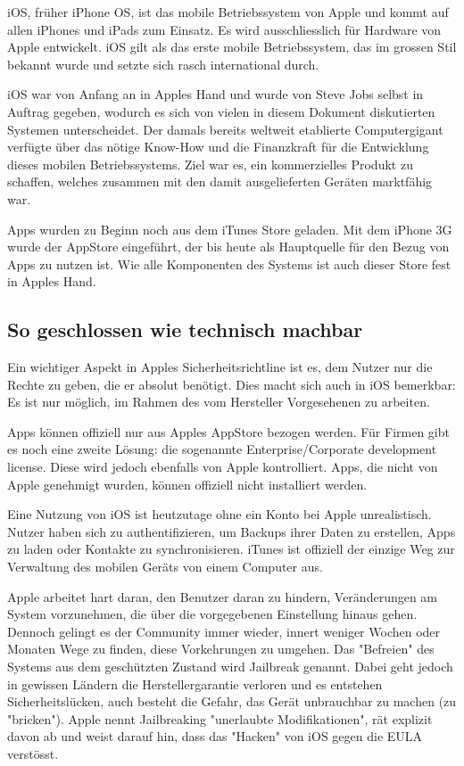 iOS, früher iPhone OS, ist das mobile Betriebssystem von Apple und kommt auf allen iPhones und iPads zum Einsatz. Es wird ausschliesslich für Hardware von Apple entwickelt. iOS gilt als das erste mobile Betriebssystem, das im grossen Stil bekannt wurde und setzte sich rasch international durch.

iOS war von Anfang an in Apples Hand und wurde von Steve Jobs selbst in Auftrag gegeben, wodurch es sich von vielen in diesem Dokument diskutierten Systemen unterscheidet. Der damals bereits weltweit etablierte Computergigant verfügte über das nötige Know-How und die Finanzkraft für die Entwicklung dieses mobilen Betriebssystems. Ziel war es, ein kommerzielles Produkt zu schaffen, welches zusammen mit den damit ausgelieferten Geräten marktfähig war.

Apps wurden zu Beginn noch aus dem iTunes Store geladen. Mit dem iPhone 3G wurde der AppStore eingeführt, der bis heute als Hauptquelle für den Bezug von Apps zu nutzen ist. Wie alle Komponenten des Systems ist auch dieser Store fest in Apples Hand.\\

\subsection{So geschlossen wie technisch machbar}
Ein wichtiger Aspekt in Apples Sicherheitsrichtline ist es, dem Nutzer nur die Rechte zu geben, die er absolut benötigt. Dies macht sich auch in iOS bemerkbar: Es ist nur möglich, im Rahmen des vom Hersteller Vorgesehenen zu arbeiten.

Apps können offiziell nur aus Apples AppStore bezogen werden. Für Firmen gibt es noch eine zweite Lösung: die sogenannte Enterprise/Corporate development license. Diese wird jedoch ebenfalls von Apple kontrolliert. Apps, die nicht von Apple genehmigt wurden, können offiziell nicht installiert werden.

Eine Nutzung von iOS ist heutzutage ohne ein Konto bei Apple unrealistisch. Nutzer haben sich zu authentifizieren, um Backups ihrer Daten zu erstellen, Apps zu laden oder Kontakte zu synchronisieren. iTunes ist offiziell der einzige Weg zur Verwaltung des mobilen Geräts von einem Computer aus.

Apple arbeitet hart daran, den Benutzer daran zu hindern, Veränderungen am System vorzunehmen, die über die vorgegebenen Einstellung hinaus gehen. Dennoch gelingt es der Community immer wieder, innert weniger Wochen oder Monaten Wege zu finden, diese Vorkehrungen zu umgehen. Das "Befreien" des Systems aus dem geschützten Zustand wird Jailbreak genannt. Dabei geht jedoch in gewissen Ländern die Herstellergarantie verloren und es entstehen Sicherheitslücken, auch besteht die Gefahr, das Gerät unbrauchbar zu machen (zu "bricken"). Apple nennt Jailbreaking "unerlaubte Modifikationen", rät explizit davon ab und weist darauf hin, dass das "Hacken" von iOS gegen die EULA verstösst.\\

